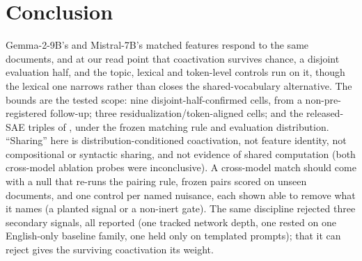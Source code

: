 \section{Conclusion}\label{sec:conclusion}

Gemma-2-9B's and Mistral-7B's matched features respond to the same documents, and at our read
point that coactivation survives chance, a disjoint evaluation half, and the topic, lexical and
token-level controls run on it,
though the lexical one narrows rather than closes the shared-vocabulary alternative. The bounds are
the tested scope: nine disjoint-half-confirmed cells, from a non-pre-registered follow-up; three
residualization/token-aligned cells; and the released-SAE triples of , under
the frozen matching rule and evaluation distribution. ``Sharing'' here is distribution-conditioned
coactivation, not feature identity, not compositional or syntactic sharing, and not evidence of
shared computation (both cross-model ablation probes were inconclusive). A cross-model match
should come with a null that re-runs the pairing rule, frozen pairs scored on unseen documents,
and one control per named nuisance, each shown able to remove what it names (a planted signal or a
non-inert gate). The same discipline rejected three secondary signals, all reported (one tracked
network depth, one rested on one English-only baseline family, one held only on templated
prompts); that it can reject gives the surviving coactivation its weight.
